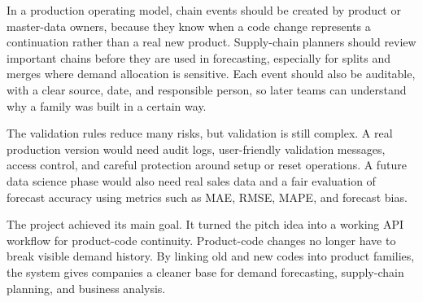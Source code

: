 \documentclass[12pt]{article}
\begin{document}
In a production operating model, chain events should be created by product or master-data owners, because they know when a code change represents a continuation rather than a real new product. Supply-chain planners should review important chains before they are used in forecasting, especially for splits and merges where demand allocation is sensitive. Each event should also be auditable, with a clear source, date, and responsible person, so later teams can understand why a family was built in a certain way.

The validation rules reduce many risks, but validation is still complex. A real production version would need audit logs, user-friendly validation messages, access control, and careful protection around setup or reset operations. A future data science phase would also need real sales data and a fair evaluation of forecast accuracy using metrics such as MAE, RMSE, MAPE, and forecast bias.

The project achieved its main goal. It turned the pitch idea into a working API workflow for product-code continuity. Product-code changes no longer have to break visible demand history. By linking old and new codes into product families, the system gives companies a cleaner base for demand forecasting, supply-chain planning, and business analysis.
\end{document}
